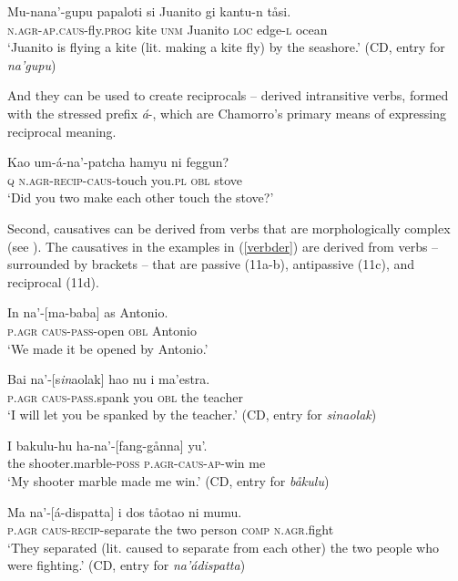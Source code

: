 \documentclass[output=paper,
modfonts
]{LSP/langsci}
\begin{document}
\begin{exe}
\begin{xlist}
\begin{exe}
\ex
\gll Mu-nana'-gupu papaloti si Juanito gi kantu-n tåsi.\\
\textsc{n.agr-ap.caus-}fly.\textsc{prog} kite \textsc{unm} Juanito
\textsc{loc} edge-\textsc{l} ocean\\
\glt `Juanito is flying a kite (lit. making a kite fly) by the seashore.'
(CD, entry for \emph{na'gupu})
\end{exe}

And they can be used to create reciprocals -- derived intransitive verbs,
formed with the stressed prefix \emph{á}-, which are Chamorro's
primary means of expressing reciprocal meaning.

\begin{exe}
\ex
\gll Kao um-á-na'-patcha hamyu ni feggun?\\
\textsc{q} \textsc{n.agr-recip-caus-}touch you.\textsc{pl} \textsc{obl} stove\\
\glt `Did you two make each other touch the stove?'
\end{exe}

Second, causatives can be derived from verbs that are morphologically
complex (see \citealt[114--121]{gibson1980}). The causatives in the examples in
(\ref{verbder}) are derived from verbs -- surrounded by brackets -- that are passive
(11a-b), antipassive (11c), and reciprocal (11d).

\begin{exe}
\ex\label{verbder}
\begin{xlist}
\ex
\gll In na'-{[}ma-baba{]} as Antonio.\\
\textsc{p.agr} \textsc{caus-pass-}open \textsc{obl} Antonio\\
\glt `We made it be opened by Antonio.'

\ex \gll Bai na'-{[}s\emph{in}aolak{]} hao nu i ma'estra.\\
\textsc{p.agr} \textsc{caus-pass.}spank you \textsc{obl} the teacher\\

\glt `I will let you be spanked by the teacher.' (CD, entry for \emph{sinaolak})

\ex \gll  I bakulu-hu ha-na'-{[}fang-gånna{]} yu'.\\
the shooter.marble-\textsc{poss} \textsc{p.agr-caus-ap-}win me\\
\glt `My shooter marble made me win.' (CD, entry for \emph{båkulu})

\ex \gll Ma na'-{[}á-dispatta{]} i dos tåotao ni mumu.\\
\textsc{p.agr} \textsc{caus-recip-}separate the two person \textsc{comp} \textsc{n.agr.}fight\\
\glt `They separated (lit. caused to separate from each other) the two people
who were fighting.' (CD, entry for \emph{na'ádispatta})
\end{xlist}
\end{exe}



\end{xlist}
\end{exe}
\end{document}
